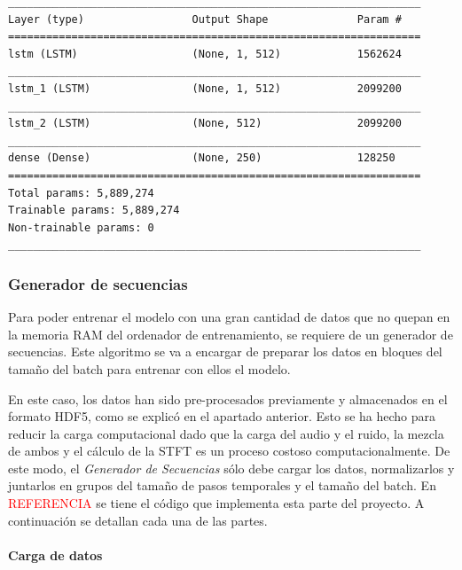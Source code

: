 \begin{lstlisting}[basicstyle=\tiny\ttfamily, caption={Resumen del modelo},captionpos=b, label={lst: model_resume},frame=tb,
xleftmargin=.2\textwidth, xrightmargin=.2\textwidth]
_________________________________________________________________
Layer (type)                 Output Shape              Param #   
=================================================================
lstm (LSTM)                  (None, 1, 512)            1562624   
_________________________________________________________________
lstm_1 (LSTM)                (None, 1, 512)            2099200   
_________________________________________________________________
lstm_2 (LSTM)                (None, 512)               2099200   
_________________________________________________________________
dense (Dense)                (None, 250)               128250    
=================================================================
Total params: 5,889,274
Trainable params: 5,889,274
Non-trainable params: 0
_________________________________________________________________
\end{lstlisting}

\subsubsection{Generador de secuencias}
Para poder entrenar el modelo con una gran cantidad de datos que no quepan en la memoria \gls{RAM} del ordenador de entrenamiento, se requiere de un generador de secuencias. Este algoritmo se va a encargar de preparar los datos en bloques del tamaño del batch para entrenar con ellos el modelo.

En este caso, los datos han sido pre-procesados previamente y almacenados en el formato \gls{HDF5}, como se explicó en el apartado anterior. Esto se ha hecho para reducir la carga computacional dado que la carga del audio y el ruido, la mezcla de ambos y el cálculo de la \gls{STFT} es un proceso costoso computacionalmente. De este modo, el \textit{Generador de Secuencias} sólo debe cargar los datos, normalizarlos y juntarlos en grupos del tamaño de pasos temporales y el tamaño del batch. En \textcolor{red}{REFERENCIA} se tiene el código que implementa esta parte del proyecto. A continuación se detallan cada una de las partes.

\paragraph{Carga de datos}

